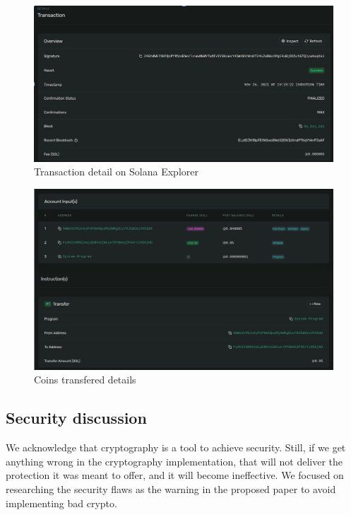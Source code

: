 \begin{itemize}
    \begin{figure}[ht!]
        \centering
        \includegraphics[width=1\textwidth]{images/testexplore1.png}
        \caption[Transaction detail on Solana Explorer]{Transaction detail on Solana Explorer}
        \label{fig:testexpl1}
    \end{figure}

    \begin{figure}[ht!]
        \centering
        \includegraphics[width=1\textwidth]{images/testexplorer2.png}
        \caption[Coins transfered details]{Coins transfered details}
        \label{fig:testexpl2}
    \end{figure}

\end{itemize}

\subsection{Security discussion}

We acknowledge that cryptography is a tool to achieve security. Still, if we get anything wrong in the cryptography implementation, that will not deliver the protection it was meant to offer, and it will become ineffective. We focused on researching the security flaws as the warning in the proposed paper to avoid implementing bad crypto.

